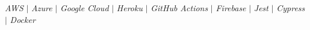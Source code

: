 \emph{AWS} $|$ \emph{Azure} $|$ \emph{Google Cloud} $|$ \emph{Heroku} $|$
\emph{GitHub Actions} $|$ \emph{Firebase} $|$
\emph{Jest} $|$ \emph{Cypress} $|$ \emph{Docker} 